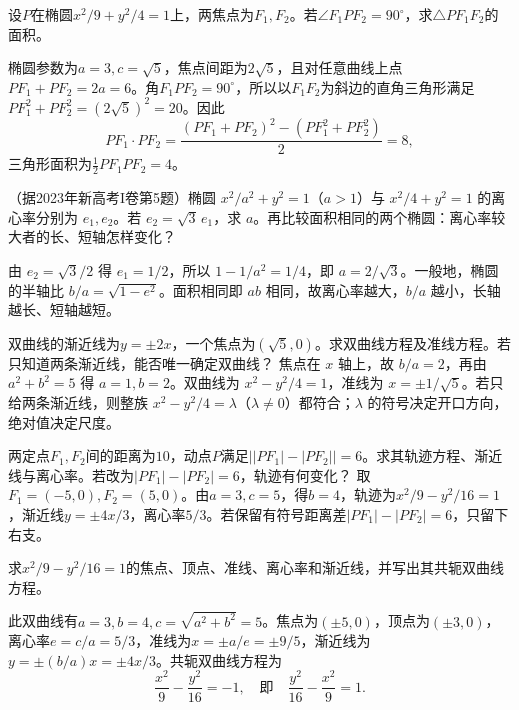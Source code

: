设\(P\)在椭圆\(x^2/9+y^2/4=1\)上，两焦点为\(F_1,F_2\)。若\(\angle F_1PF_2=90^\circ\)，求\(\triangle PF_1F_2\)的面积。
\par
\solutionanswer
椭圆参数为\(a=3,c=\sqrt5\)，焦点间距为\(2\sqrt5\)，且对任意曲线上点\(PF_1+PF_2=2a=6\)。角\(F_1PF_2=90^\circ\)，所以以\(F_1F_2\)为斜边的直角三角形满足\(PF_1^2+PF_2^2=(2\sqrt5)^2=20\)。因此
\[PF_1\cdot PF_2=\frac{(PF_1+PF_2)^2-(PF_1^2+PF_2^2)}2=8,\]
三角形面积为\(\tfrac12PF_1PF_2=4\)。


（据2023年新高考I卷第5题）椭圆 \(x^2/a^2+y^2=1\)（\(a>1\)）与 \(x^2/4+y^2=1\) 的离心率分别为 \(e_1,e_2\)。若 \(e_2=\sqrt3\,e_1\)，求 \(a\)。再比较面积相同的两个椭圆：离心率较大者的长、短轴怎样变化？
\par
\solutionanswer
由 \(e_2=\sqrt3/2\) 得 \(e_1=1/2\)，所以 \(1-1/a^2=1/4\)，即 \(a=2/\sqrt3\)。一般地，椭圆的半轴比 \(b/a=\sqrt{1-e^2}\)。面积相同即 \(ab\) 相同，故离心率越大，\(b/a\) 越小，长轴越长、短轴越短。


双曲线的渐近线为\(y=\pm2x\)，一个焦点为\((\sqrt5,0)\)。求双曲线方程及准线方程。若只知道两条渐近线，能否唯一确定双曲线？
\solutionanswer
焦点在 \(x\) 轴上，故 \(b/a=2\)，再由 \(a^2+b^2=5\) 得 \(a=1,b=2\)。双曲线为 \(x^2-y^2/4=1\)，准线为 \(x=\pm1/\sqrt5\)。若只给两条渐近线，则整族 \(x^2-y^2/4=\lambda\)（\(\lambda\ne0\)）都符合；\(\lambda\) 的符号决定开口方向，绝对值决定尺度。


两定点\(F_1,F_2\)间的距离为\(10\)，动点\(P\)满足\(\bigl||PF_1|-|PF_2|\bigr|=6\)。求其轨迹方程、渐近线与离心率。若改为\(|PF_1|-|PF_2|=6\)，轨迹有何变化？
\solutionanswer
取\(F_1=(-5,0),F_2=(5,0)\)。由\(a=3,c=5\)，得\(b=4\)，轨迹为\(x^2/9-y^2/16=1\)，渐近线\(y=\pm4x/3\)，离心率\(5/3\)。若保留有符号距离差\(|PF_1|-|PF_2|=6\)，只留下右支。


求\(x^2/9-y^2/16=1\)的焦点、顶点、准线、离心率和渐近线，并写出其共轭双曲线方程。
\par
\solutionanswer
此双曲线有\(a=3,b=4,c=\sqrt{a^2+b^2}=5\)。焦点为\((\pm5,0)\)，顶点为\((\pm3,0)\)，离心率\(e=c/a=5/3\)，准线为\(x=\pm a/e=\pm9/5\)，渐近线为\(y=\pm(b/a)x=\pm4x/3\)。共轭双曲线方程为
\[\frac{x^2}{9}-\frac{y^2}{16}=-1,\quad\text{即}\quad\frac{y^2}{16}-\frac{x^2}{9}=1.\]


